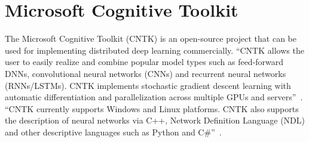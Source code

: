 \section{Microsoft Cognitive Toolkit}

The Microsoft Cognitive Toolkit (CNTK) is an open-source project that can be used for implementing distributed deep learning commercially. ``CNTK allows the user to easily realize and combine popular model types such as feed-forward DNNs, convolutional neural networks (CNNs) and recurrent neural networks (RNNs/LSTMs). CNTK implements stochastic gradient descent learning with automatic differentiation and parallelization across multiple GPUs and servers''~\cite{hid-sp18-510-web-cntk}. ``CNTK currently supports Windows and Linux platforms. CNTK also supports the description of neural networks via C++, Network Definition Language (NDL) and other descriptive languages such as Python and C\#''~\cite{hid-sp18-510-kd-cntk}.
